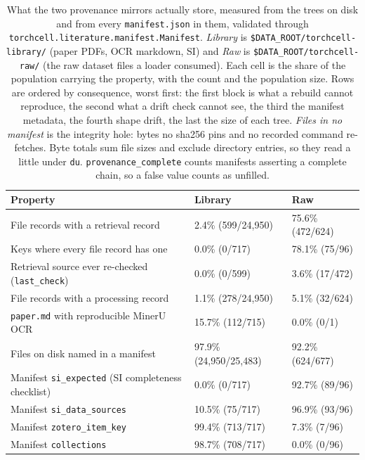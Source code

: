 \begin{table}[H]\centering
\footnotesize
\caption[]{What the two provenance mirrors actually store, measured from the trees on disk and from every \texttt{manifest.json} in them, validated through \texttt{torchcell.literature.manifest.Manifest}. \emph{Library} is \texttt{\$DATA\_ROOT/torchcell-library/} (paper PDFs, OCR markdown, SI) and \emph{Raw} is \texttt{\$DATA\_ROOT/torchcell-raw/} (the raw dataset files a loader consumed). Each cell is the share of the population carrying the property, with the count and the population size. Rows are ordered by consequence, worst first: the first block is what a rebuild cannot reproduce, the second what a drift check cannot see, the third the manifest metadata, the fourth shape drift, the last the size of each tree. \emph{Files in no manifest} is the integrity hole: bytes no sha256 pins and no recorded command re-fetches. Byte totals sum file sizes and exclude directory entries, so they read a little under \texttt{du}. \texttt{provenance\_complete} counts manifests asserting a complete chain, so a false value counts as unfilled.}
\label{tab:mirror}
\begin{tabular}{@{}L{74mm} L{48mm} L{48mm}@{}}
\toprule
Property & Library & Raw \\
\midrule
File records with a retrieval record & 2.4\% (599/24,950) & 75.6\% (472/624) \\
Keys where every file record has one & 0.0\% (0/717) & 78.1\% (75/96) \\
Retrieval source ever re-checked (\texttt{last\_check}) & 0.0\% (0/599) & 3.6\% (17/472) \\
File records with a processing record & 1.1\% (278/24,950) & 5.1\% (32/624) \\
\texttt{paper.md} with reproducible MinerU OCR & 15.7\% (112/715) & 0.0\% (0/1) \\
Files on disk named in a manifest & 97.9\% (24,950/25,483) & 92.2\% (624/677) \\
Manifest \texttt{si\_expected} (SI completeness checklist) & 0.0\% (0/717) & 92.7\% (89/96) \\
Manifest \texttt{si\_data\_sources} & 10.5\% (75/717) & 96.9\% (93/96) \\
Manifest \texttt{zotero\_item\_key} & 99.4\% (713/717) & 7.3\% (7/96) \\
Manifest \texttt{collections} & 98.7\% (708/717) & 0.0\% (0/96) \\

\end{tabular}
\end{table}

